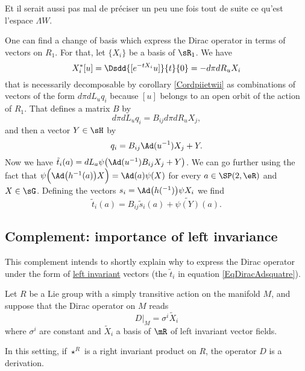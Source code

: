 \begin{probleme}
Et il serait aussi pas mal de préciser un peu une fois tout de suite ce qu'est l'espace $\Lambda W$.
\end{probleme}

One can find a change of basis which express the Dirac operator in terms of vectors on $R_1$. For that, let $\{ X_i \}$ be a basis of $\sR_1$. We have 
\[ 
  X^*_i[u]=\Dsdd{ [ e^{-tX_i}u] }{t}{0}=-d\pi dR_uX_i
\]
that is necessarily decomposable by corollary \ref{Cordpiietwii} as combinations of vectors of the form $d\pi dL_uq_i$ because $[u]$ belongs to an open orbit of the action of $R_1$. That defines a matrix $B$ by
\[ 
  d\pi dL_uq_i=B_{ij}d\pi dR_uX_j,
\]
and then a vector $Y\in \sH$ by
\begin{equation}
q_i=B_{ij}\Ad(u^{-1})X_j+Y.
\end{equation}
Now we have $\tilde t_i(a)=dL_a\psi\big( \Ad(u^{-1})B_{ij}X_j+Y \big)$. We can go further using the fact that $\psi\Big( \Ad\big( h^{-1}(a) \big)X \Big)=\Ad(a)\psi(X)$ for every $a\in\SP(2,\eR)$ and $X\in\sG$. Defining the vectors $s_i=\Ad\big( h(^{-1}) \big)\psi X_i$ we find
\begin{equation}
\tilde t_i(a)=B_{ij}\tilde s_i(a)+\widetilde{\psi(Y)}(a).
\end{equation}

\subsection{Complement: importance of left invariance}
\label{subsecImpLeftInvarDstar}

This complement intends to shortly explain why to express the Dirac operator under the form of \hyperlink{HyperDefLeftInvar}{left invariant} vectors (the $\tilde t_i$ in equation \eqref{EqDiracAdsquatre}).

Let $R$ be a Lie group with a simply transitive action on the manifold $M$, and suppose that the Dirac operator on $M$ reads
\[ 
  D|_M=\sigma^i\tilde X_i
\]
where $\sigma^i$ are constant and $\tilde X_i$ a basis of $\mR$ of left invariant vector fields.

\begin{proposition}
In this setting, if $\star^R$ is a right invariant product on $R$, the operator $D$ is a derivation. 
\end{proposition}

